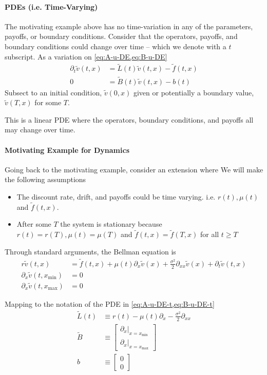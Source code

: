 \documentclass[11pt]{article}
\newcommand{\D}[1][]{\ensuremath{\partial_{#1}}}
\theoremstyle{definition}
\begin{document}
\paragraph{PDEs (i.e. Time-Varying)}
The motivating example above has no time-variation in any of the parameters, payoffs, or boundary conditions. Consider that the operators, payoffs, and boundary conditions could change over time -- which we denote with a $t$ subscript. As a variation on \cref{eq:A-u-DE,eq:B-u-DE}
\begin{align}
	\D[t] \tilde{v}(t,x) &= \tilde{L}(t) \tilde{v}(t, x) - \tilde{f}(t, x)\label{eq:A-u-DE-t}\\
	0 &= \tilde{B}(t) \tilde{v}(t, x) - b(t)\label{eq:B-u-DE-t}
\end{align}
Subsect to an initial condition, $\tilde{v}(0,x)$ given or potentially a boundary value, $\tilde{v}(T,x)$ for some $T$.

This is a linear PDE where the operators, boundary conditions, and payoffs all may change over time.


\paragraph{Motivating Example for Dynamics}
Going back to the motivating example, consider an extension where   We will make the following assumptions
\begin{itemize}
	\item The discount rate, drift, and payoffs could be time varying. i.e. $r(t), \mu(t)$ and $\tilde{f}(t,x)$.
	\item After some $T$ the system is stationary because $r(t) = r(T), \mu(t) = \mu(T)$ and $\tilde{f}(t,x) = \tilde{f}(T,x)$ for all $t \geq T$
\end{itemize}

\noindent Through standard arguments, the Bellman equation is
\begin{align}
	r \tilde{v}(t, x) &= \tilde{f}(t, x) + \mu(t) \D[x] \tilde{v}(x) + \frac{\sigma^2}{2} \D[xx]\tilde{v}(x) + \D[t] \tilde{v}(t, x)\\
	\D[x]\tilde{v}(t, x_{\min}) &= 0\\
	\D[x] \tilde{v}(t, x_{\max}) &= 0
\end{align}

\noindent Mapping to the notation of the PDE in \cref{eq:A-u-DE-t,eq:B-u-DE-t}
\begin{align}
	\tilde{L}(t) &\equiv r(t) - \mu(t) \D[x] - \frac{\sigma^2}{2}\D[xx]\\
	\tilde{B} &\equiv \begin{bmatrix}
	\partial_x\vert_{x = x_{\min}}\\
	\partial_x\vert_{x = x_{\max}}
\end{bmatrix}\\
b &\equiv \begin{bmatrix} 0\\ 0 \end{bmatrix}
\end{align}
\end{document}
